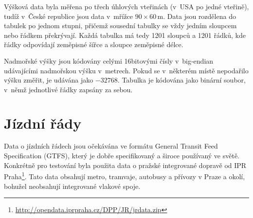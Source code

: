 Výšková data byla měřena po třech úhlových vteřinách (v~USA po jedné vteřině),
tudíž v~České republice jsou data v~mřížce $90\times60$\,m. Data jsou rozdělena
do tabulek po jednom stupni, přičemž sousední tabulky se vždy jedním sloupcem
nebo řádkem překrývají. Každá tabulka má tedy 1201 sloupců a 1201 řádků, kde
řádky odpovídají zeměpisné šířce a sloupce zeměpisné délce.

Nadmořské výšky jsou kódovány celými 16bitovými čísly v~big-endian udávajícími
nadmořskou výšku v~metrech. Pokud se v~některém místě nepodařilo výšku změřit,
je udávána jako $-32768$. Tabulka je kódována jako binární soubor, v~němž
jednotlivé řádky zapsány za sebou.

\section{Jízdní řády}
Data o jízdních řádech jsou očekávána ve formátu General Transit Feed
Specification (GTFS), který je dobře specifikovaný a široce používaný ve světě.
Konkrétně pro testování byla použita data o pražské integrované dopravě od IPR
Praha\footnote{\url{http://opendata.iprpraha.cz/DPP/JR/jrdata.zip}}. Tato data
obsahují metro, tramvaje, autobusy a přívozy v Praze a okolí, bohužel neobsahují
integrované vlakové spoje.

